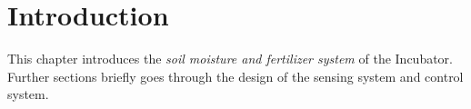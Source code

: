 \documentclass[../../main]{subfiles}
\begin{document}
\section{Introduction} \label{sec:}

This chapter introduces the \emph{soil moisture and fertilizer system} of the Incubator. Further
sections briefly goes through the design of the sensing system and control system.
\end{document}
